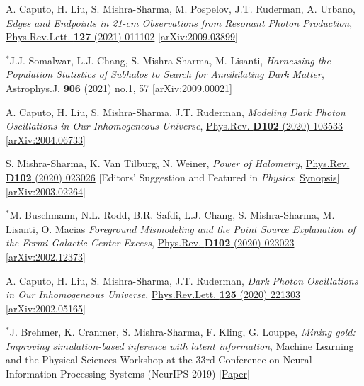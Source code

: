 \documentclass[letterpaper,11pt]{article}
\newenvironment{packed_enumerate}[1][]{
\begin{etaremune}[#1]
  \setlength{\itemsep}{3.9pt}
  \setlength{\parskip}{0pt}
  \setlength{\parsep}{0pt}}{\end{etaremune}
}
\begin{document}
\begin{packed_enumerate}[start=26]
  \item A. Caputo, H. Liu, S. Mishra-Sharma, M. Pospelov, J.T. Ruderman, A. Urbano, \emph{Edges and Endpoints in 21-cm Observations from Resonant Photon Production},  \href{https://journals.aps.org/prl/abstract/10.1103/PhysRevLett.127.011102}{Phys.Rev.Lett. \textbf{127} (2021) 011102}   \href{https://arxiv.org/abs/2009.03899}{[arXiv:2009.03899]}

  \item $^*$J.J. Somalwar, L.J. Chang, S. Mishra-Sharma, M. Lisanti, \emph{Harnessing the Population Statistics of Subhalos to Search for Annihilating Dark Matter}, \href{https://iopscience.iop.org/article/10.3847/1538-4357/abc87d}{Astrophys.J. \textbf{906} (2021) no.1, 57} \href{https://arxiv.org/abs/2009.00021}{[arXiv:2009.00021]}

  \item A. Caputo, H. Liu, S. Mishra-Sharma, J.T. Ruderman, \emph{Modeling Dark Photon Oscillations in Our Inhomogeneous Universe}, \href{https://journals.aps.org/prd/abstract/10.1103/PhysRevD.102.103533}{Phys.Rev. \textbf{D102} (2020) 103533}   \href{https://arxiv.org/abs/2004.06733}{[arXiv:2004.06733]}

  \item S. Mishra-Sharma, K. Van Tilburg, N. Weiner, \emph{Power of Halometry}, \href{https://journals.aps.org/prd/abstract/10.1103/PhysRevD.102.023026}{Phys.Rev. \textbf{D102} (2020) 023026} [Editors' Suggestion and Featured in \emph{Physics}; \href{https://physics.aps.org/articles/v13/s98}{Synopsis}]  \href{https://arxiv.org/abs/2003.02264}{[arXiv:2003.02264]}

  \item $^*$M. Buschmann, N.L. Rodd, B.R. Safdi, L.J. Chang, S. Mishra-Sharma, M. Lisanti, O. Macias \emph{Foreground Mismodeling and the Point Source Explanation of the Fermi Galactic Center Excess},  \href{https://journals.aps.org/prd/abstract/10.1103/PhysRevD.102.023023}{Phys.Rev. \textbf{D102} (2020) 023023} \href{https://arxiv.org/abs/2002.12373}{[arXiv:2002.12373]} 

  \item A. Caputo, H. Liu, S. Mishra-Sharma, J.T. Ruderman, \emph{Dark Photon Oscillations in Our Inhomogeneous Universe}, \href{https://journals.aps.org/prl/abstract/10.1103/PhysRevLett.125.221303}{Phys.Rev.Lett. \textbf{125} (2020) 221303}  \href{https://arxiv.org/abs/2002.05165}{[arXiv:2002.05165]}

  \item $^*$J. Brehmer, K. Cranmer, S. Mishra-Sharma, F. Kling, G. Louppe, \emph{Mining gold: Improving simulation-based inference with latent information}, {Machine Learning and the Physical Sciences Workshop at the 33rd Conference on Neural Information Processing Systems (NeurIPS 2019)} \href{https://ml4physicalsciences.github.io/files/NeurIPS_ML4PS_2019_16.pdf}{[Paper]}


\end{packed_enumerate}
\end{document}
